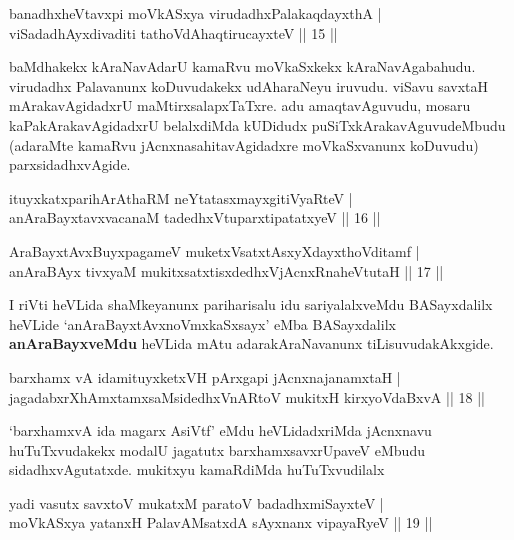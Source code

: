 
\begin{shl}
banadhxheVtavxpi moVkASxya virudadhxPalakaqdayxthA |\\
viSadadhAyxdivaditi tathoVdAhaqtirucayxteV \hfill || 15 ||
\end{shl}

\begin{artha}
baMdhakekx kAraNavAdarU kamaRvu moVkaSxkekx kAraNavAgabahudu. virudadhx Palavanunx koDuvudakekx udAharaNeyu iruvudu. viSavu savxtaH mArakavAgidadxrU maMtirxsalapxTaTxre. adu amaqtavAguvudu, mosaru kaPakArakavAgidadxrU belalxdiMda kUDidudx puSiTxkArakavAguvudeMbudu (adaraMte kamaRvu jAcnxnasahitavAgidadxre moVkaSxvanunx koDuvudu) parxsidadhxvAgide.
\end{artha}


\begin{shl}
ituyxkatxparihArAthaRM neYtatasxmayxgitiVyaRteV |\\
anAraBayxtavxvacanaM tadedhxVtuparxtipatatxyeV \hfill || 16 ||
\end{shl}
\begin{shl}
AraBayxtAvxBuyxpagameV muketxVsatxtAsxyXdayxthoVditamf |\\
anAraBAyx tivxyaM mukitxsatxtisxdedhxVjAcnxRnaheVtutaH \hfill || 17 ||
\end{shl}

\begin{artha}
I riVti heVLida shaMkeyanunx pariharisalu idu sariyalalxveMdu BASayxdalilx heVLide `anAraBayxtAvxnoVmxkaSxsayx' eMba BASayxdalilx \textbf{anAraBayxveMdu} heVLida mAtu adarakAraNavanunx tiLisuvudakAkxgide.
\end{artha}

\begin{shl}
barxhamx vA idamituyxketxVH pArxgapi jAcnxnajanamxtaH |\\
jagadabxrXhAmxtamxsaMsidedhxVnARtoV mukitxH kirxyoVdaBxvA \hfill || 18 ||
\end{shl}

\begin{artha}
`barxhamxvA ida magarx AsiVtf' eMdu heVLidadxriMda jAcnxnavu huTuTxvudakekx modalU jagatutx barxhamxsavxrUpaveV eMbudu sidadhxvAgutatxde. mukitxyu kamaRdiMda huTuTxvudilalx
\end{artha}

\begin{shl}
yadi vasutx savxtoV mukatxM paratoV badadhxmiSayxteV |\\
moVkASxya yatanxH PalavAMsatxdA sAyxnanx vipayaRyeV \hfill || 19 ||
\end{shl}

